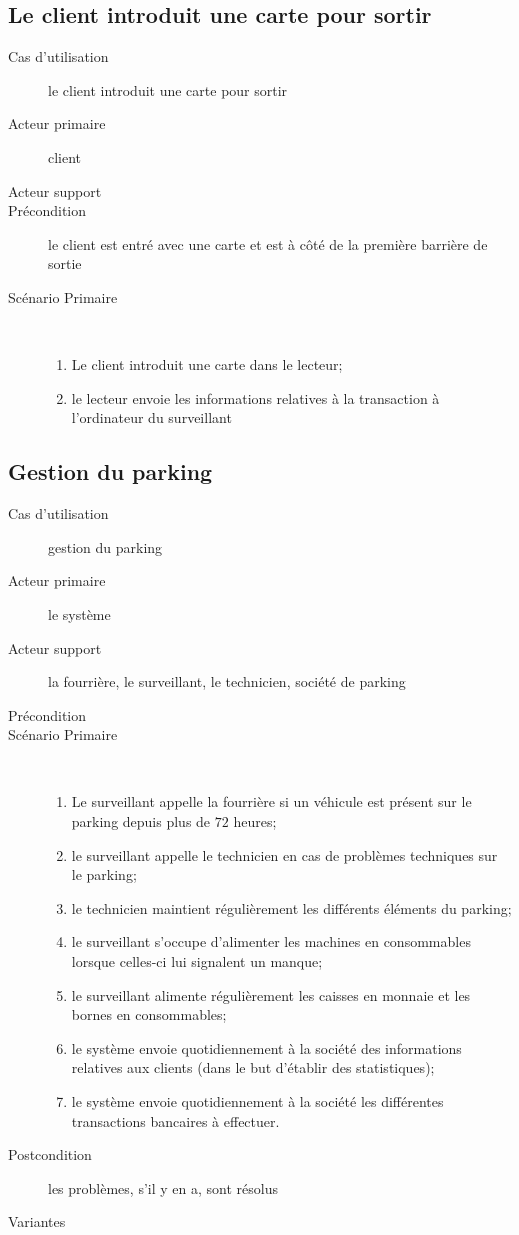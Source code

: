 \documentclass[a4paper]{article}
\begin{document}
\subsection{Le client introduit une carte pour sortir}
\begin{description}
	\item[Cas d'utilisation] le client introduit une carte pour sortir
	\item[Acteur primaire] client
	\item[Acteur support]
	\item[Pr\'econdition] le client est entr\'e avec une carte et est \`a
		c\^ot\'e de la premi\`ere barri\`ere de sortie
	\item[Sc\'enario Primaire] \
	\begin{enumerate}
		\item Le client introduit une carte dans le lecteur;
		\item le lecteur envoie les informations relatives \`a la transaction
			\`a l'ordinateur du surveillant
	\end{enumerate}
\end{description}

\subsection{Gestion du parking}
\begin{description}
	\item[Cas d'utilisation] gestion du parking
	\item[Acteur primaire] le syst\`eme
	\item[Acteur support]  la fourri\`ere, le surveillant, le technicien, soci\'et\'e
				de parking
	\item[Pr\'econdition] 
	\item[Sc\'enario Primaire] \
	\begin{enumerate}
		\item Le surveillant appelle la fourri\`ere si un v\'ehicule est
			pr\'esent sur le parking depuis plus de $72$ heures;
		\item le surveillant appelle le technicien en cas de probl\`emes
			techniques sur le parking;
		\item le technicien maintient r\'eguli\`erement les diff\'erents
			\'el\'ements du parking;
		\item le surveillant s'occupe d'alimenter les machines en consommables
			lorsque celles-ci lui signalent un manque;
		\item le surveillant alimente r\'eguli\`erement les caisses en
			monnaie et les bornes en consommables;
		\item le syst\`eme envoie quotidiennement \`a la soci\'et\'e des
			informations relatives aux clients (dans le but d'\'etablir des
			statistiques);
		\item le syst\`eme envoie quotidiennement \`a la soci\'et\'e les
			diff\'erentes transactions bancaires \`a effectuer.
	\end{enumerate}
	\item[Postcondition] les probl\`emes, s'il y en a, sont r\'esolus
	\item[Variantes] \
\end{description}
\end{document}
